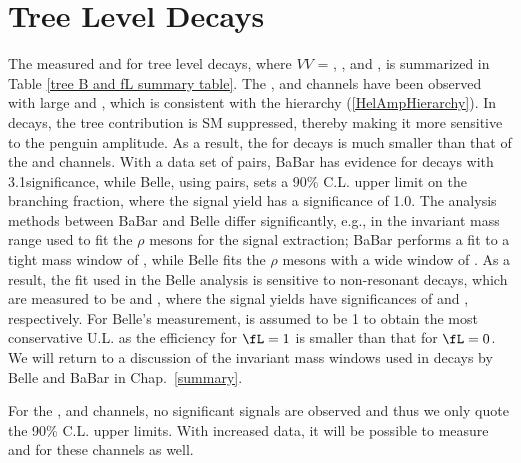 \section{Tree Level \bm{\Bvv} Decays \label{Tree level Bvv decays}}
The measured \calB and \fL for tree level \Bvv decays, where $VV$ = \RhoRho, \OmeRho, \Ome\Ome and \PhiPhi, is summarized in Table \ref{tree B and fL summary table}. The \RhopRhom, \RhopRhoz and \OmeRhop channels have been observed with large \calB and \fL, which is consistent with the hierarchy (\ref{HelAmpHierarchy}). In \RhozRhoz decays, the tree contribution is SM suppressed, thereby making it more sensitive to the penguin amplitude. As a result, the \calB for \RhozRhoz decays is much smaller than that of the \RhopRhom and \RhopRhoz channels. With a data set of \BzToRhozRhozBabarDataSet \BBbar pairs, BaBar has evidence for \BzToRhozRhoz decays with 3.1\sig significance, while Belle, using \NBBbarVal \BBbar pairs, sets a 90\% C.L. upper limit on the branching fraction, where the signal yield has a significance of 1.0\sig. The analysis methods between BaBar and Belle differ significantly, e.g., in the invariant mass range used to fit the $\rho$ mesons for the signal extraction; BaBar performs a fit to a tight mass window of \RhozRhozWindowBabar, while Belle fits the $\rho$ mesons with a wide window of \RhozRhozWindowBelle. As a result, the fit used in the Belle analysis is sensitive to non-resonant decays, which are measured to be \BzToRhozPipPimBelleBr and \BzToFourPiBelleBr, where the signal yields have significances of \BzToRhozPipPimBelleSig and \BzToFourPiBelleSig, respectively. For Belle's \calB measurement, \fL is assumed to be 1 to obtain the most conservative U.L. as the efficiency for $\fL=1$ is smaller than that for $\fL=0$. We will return to a discussion of the invariant mass windows used in \Bvv decays by Belle and BaBar in Chap.~\ref{summary}.

For the \OmeRhoz, \OmeOme and \PhiPhi channels, no significant signals are observed and thus we only quote the 90\% C.L. upper limits. With increased data, it will be possible to measure \calB and \fL for these channels as well.


